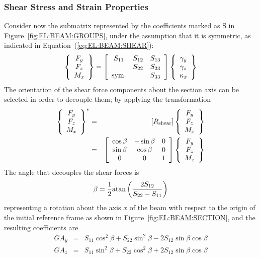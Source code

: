 \subsubsection{Shear Stress and Strain Properties}
Consider now the submatrix represented by the coefficients 
marked as S in Figure~\ref{fig:EL:BEAM:GROUPS}, under the assumption 
that it is symmetric, as indicated in Equation~(\ref{eq:EL:BEAM:SHEAR}):
\begin{equation}
	\cubr{\cvvect{
		F_y \\
		F_z \\
		M_x
	}} = \sqbr{\matr{ccc}{
		S_{11} & S_{12} & S_{13} \\
		 & S_{22} & S_{23} \\
		\llk{sym.} & & S_{33}
	}}\cubr{\cvvect{
		\gamma_y \\
		\gamma_z \\
		\kappa_x
	}}
	\label{eq:EL:BEAM:SHEAR}
\end{equation}
The orientation of the shear force components about the section axis
can be selected in order to decouple them; by applying the transformation
\begin{eqnarray}
	\cubr{\cvvect{
		F_y \\
		F_z \\
		M_x
	}}^*
	& = & \sqbr{R_{\llk{shear}}}\cubr{\cvvect{
		F_y \\
		F_z \\
		M_x
	}}
	\nonumber \\
	& = & \sqbr{\matr{ccc}{
		\cos\beta & -\sin\beta & 0 \\
		\sin\beta & \cos\beta & 0 \\
		0 & 0 & 1
	}}\cubr{\cvvect{
		F_y \\
		F_z \\
		M_x
	}}
	\label{eq:EL:BEAM:SHEAR-ROTATION}
\end{eqnarray}
The angle that decouples the shear forces is
\begin{equation*}
	\beta = \frac{1}{2}\mathrm{atan}\left( \frac{2 S_{12}}{S_{22} - S_{11}} \right)
\end{equation*}
representing a rotation about the axis $x$ of the beam with respect
to the origin of the initial reference frame as shown 
in Figure~\ref{fig:EL:BEAM:SECTION},
and the resulting coefficients are
\begin{eqnarray}
	GA_y & = & S_{11} \cos^2\beta + S_{22} \sin^2\beta
		- 2 S_{12} \sin\beta \cos\beta \\
	GA_z & = & S_{11} \sin^2\beta + S_{22} \cos^2\beta
		+ 2 S_{12} \sin\beta \cos\beta
\end{eqnarray}
